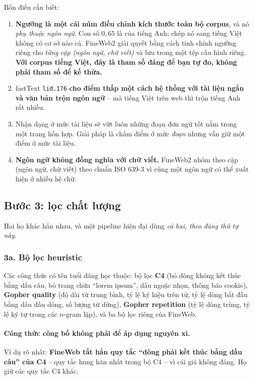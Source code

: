 Bốn điều cần biết:
\begin{enumerate}
	\item \textbf{Ngưỡng là một cái núm điều chỉnh kích thước toàn bộ corpus}, và nó \emph{phụ thuộc ngôn ngữ}. Con số $0{,}65$ là của tiếng Anh; chép nó sang tiếng Việt không có cơ sở nào cả. FineWeb2 giải quyết bằng cách tinh chỉnh ngưỡng riêng cho \emph{từng cặp (ngôn ngữ, chữ viết)} và lưu trong một tệp cấu hình riêng. \textbf{Với corpus tiếng Việt, đây là tham số đáng để bạn tự đo, không phải tham số để kế thừa.}
	\item fastText \texttt{lid.176} \textbf{cho điểm thấp một cách hệ thống với tài liệu ngắn và văn bản trộn ngôn ngữ} -- mà tiếng Việt trên web thì trộn tiếng Anh rất nhiều.
	\item Nhận dạng ở mức tài liệu sẽ vứt luôn những đoạn đơn ngữ tốt nằm trong một trang hỗn hợp. Giải pháp là chấm điểm ở mức \emph{đoạn} nhưng vẫn giữ một điểm ở mức tài liệu.
	\item \textbf{Ngôn ngữ không đồng nghĩa với chữ viết.} FineWeb2 nhóm theo cặp (ngôn ngữ, chữ viết) theo chuẩn ISO 639-3 vì cùng một ngôn ngữ có thể xuất hiện ở nhiều hệ chữ.
\end{enumerate}

\subsection{Bước 3: lọc chất lượng}
\label{ssec:quality_filter}

Hai họ khác hẳn nhau, và một pipeline hiện đại dùng \emph{cả hai, theo đúng thứ tự này}.

\subsubsection{3a. Bộ lọc heuristic}

Các công thức có tên tuổi đáng học thuộc: bộ lọc \textbf{C4} (bỏ dòng không kết thúc bằng dấu câu, bỏ trang chứa “lorem ipsum”, dấu ngoặc nhọn, thông báo cookie), \textbf{Gopher quality} (độ dài từ trung bình, tỷ lệ ký hiệu trên từ, tỷ lệ dòng bắt đầu bằng dấu đầu dòng, số lượng từ dừng), \textbf{Gopher repetition} (tỷ lệ dòng trùng, tỷ lệ ký tự trong các $n$-gram lặp), và ba bộ lọc riêng của FineWeb.

\paragraph{Công thức công bố không phải để áp dụng nguyên xi.} Ví dụ rõ nhất: \textbf{FineWeb tắt hẳn quy tắc “dòng phải kết thúc bằng dấu câu” của C4} -- quy tắc hung hãn nhất trong bộ C4 -- vì cái giá không đáng. Họ giữ các quy tắc C4 khác.

